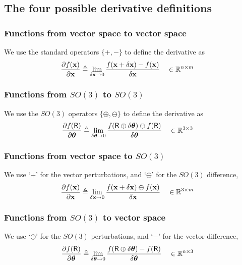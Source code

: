\subsection{The four possible derivative definitions}

\subsubsection{Functions from vector space to vector space}

We use the standard operators $\{+,-\}$ to define the derivative as
%
\begin{align}
\frac{\partial f({\bf x})}{\partial{\bf x}} &\triangleq \lim_{\delta{\bf x}\to0}\frac{f({\bf x}+\delta{\bf x})-f({\bf x})}{\delta{\bf x}} &&\in {\mathbb R}^{n\times m} \label{equ:derivative_vector}
\end{align}

\subsubsection{Functions from $SO(3)$ to $SO(3)$}

We use the $SO(3)$ operators $\{\oplus,\ominus\}$ to define the derivative as
%
\begin{align}
\frac{\partial f(\mathsf R)}{\partial{{\bm \theta}}} 
&\triangleq \lim_{\delta{{\bm \theta}}\to0}\frac{f(\mathsf R\oplus\delta{{\bm \theta}})\ominus f(\mathsf R)}{\delta{{\bm \theta}}}  && \in {\mathbb R}^{3\times 3}
\label{equ:derivative_SO3}
\end{align}

\subsubsection{Functions from vector space to $SO(3)$}

We use `+' for the vector perturbations, and `$\ominus$' for the $SO(3)$ difference,
%
\begin{align}
\frac{\partial f({\bf x})}{\partial{\bf x}} &\triangleq \lim_{\delta{\bf x}\to0} \frac{ f({\bf x}+\delta{\bf x})\ominus f({\bf x})}{\delta{\bf x}} && \in {\mathbb R}^{3\times m} \label{equ:dif_RtoSO3}
\end{align}


\subsubsection{Functions from $SO(3)$ to vector space}


We use `$\oplus$' for the $SO(3)$ perturbations, and `$-$' for the vector difference,
%
\begin{align}
\frac{\partial f(\mathsf R)}{\partial{{\bm \theta}}} &\triangleq \lim_{\delta{{\bm \theta}}\to0} \frac{f(\mathsf R\oplus\delta{{\bm \theta}}) - f(\mathsf R)}{\delta{{\bm \theta}}} && \in {\mathbb R}^{n\times 3} \label{equ:jacobian_SO3_Rn}
\end{align}



